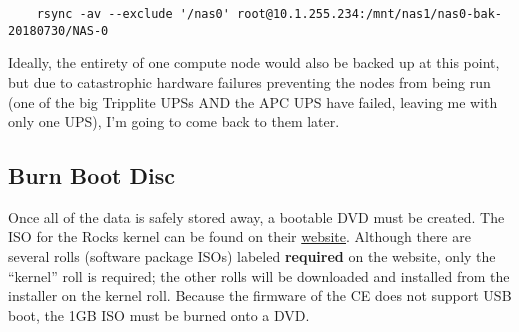 \documentclass[12pt]{article}
\begin{document}
\begin{tcolorbox}[title=Backup the server partition of NAS-0 (executed in CE),
  colback=white, colframe=black, coltitle=green]
  \begin{verbatim}
    rsync -av --exclude '/nas0' root@10.1.255.234:/mnt/nas1/nas0-bak-20180730/NAS-0
  \end{verbatim}
\end{tcolorbox}

\qq Ideally, the entirety of one compute node would also be backed up at this
point, but due to catastrophic hardware failures preventing the nodes from being
run (one of the big Tripplite UPSs AND the APC UPS have failed, leaving me with
only one UPS), I'm going to come back to them later.

\subsection{Burn Boot Disc}

\qq Once all of the data is safely stored away, a bootable DVD must be
created. The ISO for the Rocks kernel can be found on their
\href{http://www.rocksclusters.org/downloads/2017-12-01-download-rocks-7-0-manzanita.html}{website}. Although
there are several rolls (software package ISOs) labeled \textbf{required} on the
website, only the ``kernel'' roll is required; the other rolls will be
downloaded and installed from the installer on the kernel roll. Because the
firmware of the CE does not support USB boot, the 1GB ISO must be burned onto a
DVD.
\end{document}
